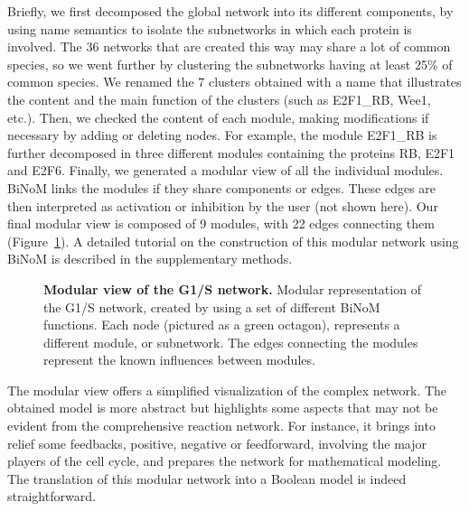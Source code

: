 \documentclass[10pt]{bmc_article}
\newenvironment{bmcformat}{\baselineskip20pt\sloppy\setboolean{publ}{false}}{\baselineskip20pt\sloppy}
\begin{document}
\begin{bmcformat}
Briefly, we first decomposed the global network into its different components,
by using name semantics to isolate the subnetworks in which
each protein is involved. The 36 networks that are created this way may share a
lot of common species, so we went further
by clustering the subnetworks having at least 25\% of common species. We renamed
the 7 clusters obtained with a name that illustrates the content and the main
function of the clusters (such as E2F1\_RB, Wee1, etc.). Then, we checked the
content of each module, making modifications if necessary by adding or deleting nodes. 
For example, the module E2F1\_RB is
further decomposed in three different modules containing the proteins RB, E2F1
and E2F6. Finally, we generated a modular view of all the individual modules.
BiNoM links the modules if they share components or edges. These edges are then
interpreted as activation or inhibition by the user (not shown here). Our final
modular view is composed of 9 modules, with 22
edges connecting them (Figure~\ref{g1smodular}). A detailed tutorial on the
construction of this modular network using BiNoM is described in the
supplementary methods.


\begin{figure}[h]
 \caption{\label{g1smodular}  \textbf{Modular view of the G1/S network.}
	Modular representation of the G1/S network, created by using a set of
different BiNoM functions. Each node (pictured as a green octagon), represents a
different module, or subnetwork. The edges connecting the modules represent the
 known influences between modules. }
\end{figure}

The modular view offers a simplified visualization of the complex network. The
obtained model is more abstract but highlights some aspects that may not be
evident from the comprehensive reaction network. For instance, it brings into relief some
feedbacks, positive, negative or feedforward, involving the major players of the
cell cycle, and prepares the network for mathematical modeling. The translation
of this modular network into a Boolean model is indeed straightforward. 


\end{bmcformat}
\end{document}
